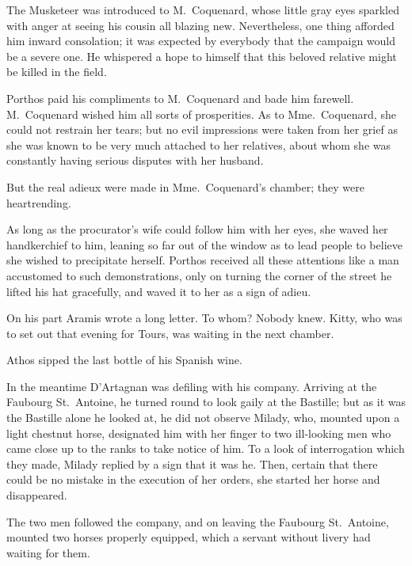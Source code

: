 The Musketeer was introduced to M.~Coquenard, whose little gray eyes sparkled with anger at seeing his cousin all blazing new. Nevertheless, one thing afforded him inward consolation; it was expected by everybody that the campaign would be a severe one. He whispered a hope to himself that this beloved relative might be killed in the field. 

Porthos paid his compliments to M.~Coquenard and bade him farewell. M.~Coquenard wished him all sorts of prosperities. As to Mme.~Coquenard, she could not restrain her tears; but no evil impressions were taken from her grief as she was known to be very much attached to her relatives, about whom she was constantly having serious disputes with her husband. 

But the real adieux were made in Mme.~Coquenard's chamber; they were heartrending. 

As long as the procurator's wife could follow him with her eyes, she waved her handkerchief to him, leaning so far out of the window as to lead people to believe she wished to precipitate herself. Porthos received all these attentions like a man accustomed to such demonstrations, only on turning the corner of the street he lifted his hat gracefully, and waved it to her as a sign of adieu. 

On his part Aramis wrote a long letter. To whom? Nobody knew. Kitty, who was to set out that evening for Tours, was waiting in the next chamber. 

Athos sipped the last bottle of his Spanish wine. 

In the meantime D'Artagnan was defiling with his company. Arriving at the Faubourg St.~Antoine, he turned round to look gaily at the Bastille; but as it was the Bastille alone he looked at, he did not observe Milady, who, mounted upon a light chestnut horse, designated him with her finger to two ill-looking men who came close up to the ranks to take notice of him. To a look of interrogation which they made, Milady replied by a sign that it was he. Then, certain that there could be no mistake in the execution of her orders, she started her horse and disappeared. 

The two men followed the company, and on leaving the Faubourg St.~Antoine, mounted two horses properly equipped, which a servant without livery had waiting for them. 